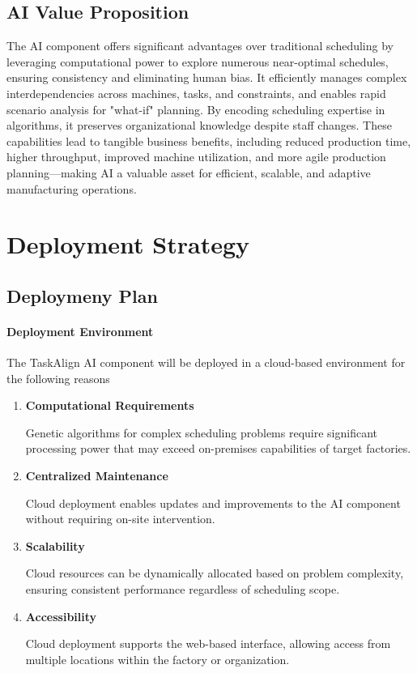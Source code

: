 \subsection{AI Value Proposition} 
\label{subsec:ai_value_proposition_continued} %

The AI component offers significant advantages over traditional scheduling by leveraging computational power to explore numerous near-optimal schedules, ensuring consistency and eliminating human bias. It efficiently manages complex interdependencies across machines, tasks, and constraints, and enables rapid scenario analysis for "what-if" planning. By encoding scheduling expertise in algorithms, it preserves organizational knowledge despite staff changes. These capabilities lead to tangible business benefits, including reduced production time, higher throughput, improved machine utilization, and more agile production planning—making AI a valuable asset for efficient, scalable, and adaptive manufacturing operations.

\section{Deployment Strategy}
\subsection{Deploymeny Plan}

\label{subsec:deployment_plan}

\paragraph{Deployment Environment}
The TaskAlign AI component will be deployed in a cloud-based environment for the following reasons

\begin{enumerate}[label=\arabic*., nosep,leftmargin=*,topsep=2pt, partopsep=0pt, itemsep=1pt]
    \item \textbf{Computational Requirements} 
    
    Genetic algorithms for complex scheduling problems require significant processing power that may exceed on-premises capabilities of target factories.
    \item \textbf{Centralized Maintenance} 
    
    Cloud deployment enables updates and improvements to the AI component without requiring on-site intervention.
    \item \textbf{Scalability} 
    
    Cloud resources can be dynamically allocated based on problem complexity, ensuring consistent performance regardless of scheduling scope.
    \item \textbf{Accessibility} 
    
    Cloud deployment supports the web-based interface, allowing access from multiple locations within the factory or organization.
\end{enumerate}

